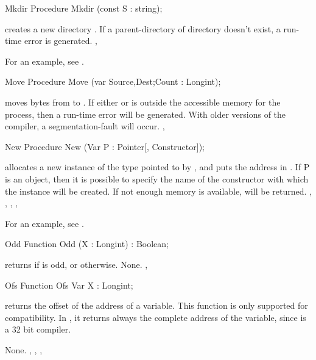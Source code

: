 \documentclass{report}
\begin{document}
\html{}
\begin{procedure}{Mkdir}
\Declaration
Procedure Mkdir (const S : string);

\Description
{} creates a new  directory .
\Errors
If a parent-directory of directory  doesn't exist, a run-time error is generated.
\SeeAlso
{}, 
\end{procedure}
For an example, see .
\begin{procedure}{Move}
\Declaration
Procedure Move (var Source,Dest;Count : Longint);

\Description
{} moves  bytes from  to .
\Errors
If either  or  is outside the accessible memory for
the process, then a run-time error will be generated. With older versions of
the compiler, a segmentation-fault will occur. 
\SeeAlso
{}, 
\end{procedure}
\html{}
\begin{procedure}{New}
\Declaration
Procedure New (Var P : Pointer[, Constructor]);

\Description
{} allocates a new instance of the type pointed to by , and
puts the address in . 
If P is an object, then it is possible to
specify the name of the constructor with which the instance will be created.
\Errors
If not enough memory is available,  will be returned.
\SeeAlso
{}, , , ,
\end{procedure}
For an example, see .
\begin{function}{Odd}
\Declaration
Function Odd (X : Longint) : Boolean;

\Description
{} returns  if  is odd, or  otherwise.
\Errors
None.
\SeeAlso
{}, 
\end{function}
\html{}
\begin{function}{Ofs}
\Declaration
Function Ofs Var X : Longint;

\Description
{} returns the offset of the address of a variable. 
This function is only supported for compatibility. In \fpc, it 
returns always the complete address of the variable, since \fpc is a 32 bit 
compiler.

\Errors
None.
\SeeAlso
{}, , , 
\end{function}
\end{document}
